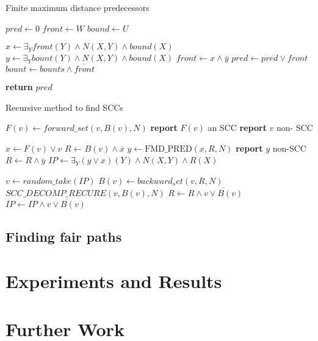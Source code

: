 \documentclass[11pt]{article}
\begin{document}
        \begin{algorithm}[H]
            \caption{Finite maximum distance predecessors}\label{fmd}
                \State $pred \gets 0$
                \State $front \gets W$
                \State $bound \gets U$
                
                    \State $x \gets \exists_Y front(Y)\wedge N(X, Y) \wedge bound(X)$
                    \State $y \gets \exists_Y bount(Y)\wedge N(X, Y) \wedge bound(X)$
                    \State $front \gets x \wedge \overline{y}$
                    \State $pred \gets pred \vee front$
                    \State $bount \gets bounts \wedge \overline{front}$
                \EndWhile

                \State \textbf{return} $pred$
            \EndProcedure
        \end{algorithm}

        \begin{algorithm}[H]
            \caption{Recursive method to find SCCs}\label{recursiveSCC}
                \State $F(v) \gets forward\_set(v, B(v), N)$
                    \State \textbf{report} $F(v)$ an SCC
                \Else
                    \State \textbf{report} $v$ non- SCC
                \EndIf

                \State $x \gets F(v) \vee v$
                \State $R \gets B(v) \wedge \overline{x}$
                \State $y \gets \text{FMD\_PRED}(x, R, N)$
                \State \textbf{report} $y$ non-SCC
                \State $R \gets R \wedge \overline{y}$
                \State $IP \gets \exists_Y (y\vee x)(Y)\wedge N(X,Y) \wedge R(X)$
                
                    \State $v \gets random\_take(IP)$
                    \State $B(v) \gets backward_set(v, R, N)$
                    \State $SCC\_DECOMP\_RECURE(v, B(v), N)$
                    \State $R \gets R \wedge \overline{v \vee B(v)}$
                    \State $IP \gets IP \wedge \overline {v \vee B(v)}$

            \EndProcedure
        \end{algorithm}

    \subsection{Finding fair paths}


\section{Experiments and Results}

\section{Further Work}

\pagebreak


\end{document}
